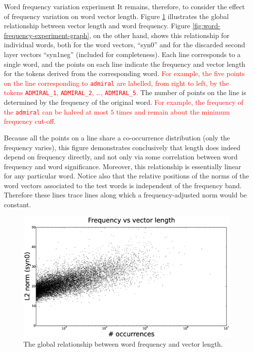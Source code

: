 \documentclass{article} %
\newcommand{\word}[1]{\texttt{#1}}
\begin{document}
\begin{section}{Word frequency variation experiment}
It remains, therefore, to consider the effect of frequency variation on word vector length.
Figure \ref{fig:frequency-norm-graph} illustrates the global relationship between vector length and word frequency.
Figure \ref{fig:word-frequency-experiment-graph}, on the other hand, shows this relationship for individual words, both for the word vectors, ``syn0'' and for the discarded second layer vectors ``syn1neg'' (included for completeness).
Each line corresponds to a single word, and the points on each line indicate the frequency and vector length for the tokens derived from the corresponding word.
\textcolor{red}{For example, the five points on the line corresponding to \word{admiral} are labelled, from right to left, by the tokens \word{ADMIRAL\_1}, \word{ADMIRAL\_2}, \dots, \word{ADMIRAL\_5}.}
The number of points on the line is determined by the frequency of the original word.
\textcolor{red}{For example, the frequency of the \word{admiral} can be halved at most $5$ times and remain about the minimum frequency cut-off.}

Because all the points on a line share a co-occurrence distribution (only the frequency varies), this figure demonstrates conclusively that length does indeed depend on frequency directly, and not only via some correlation between word frequency and word significance.
Moreover, this relationship is essentially linear for any particular word.
Notice also that the relative positions of the norms of the word vectors associated to the test words is independent of the frequency band.
Therefore these lines trace lines along which a frequency-adjusted norm would be constant.


\begin{figure}
	\includegraphics[scale=0.3]{frequency-norm-scatterplot}
	\caption{ The global relationship between word frequency and vector length.  }
	\label{fig:frequency-norm-graph}
\end{figure}


\end{section}
\end{document}
